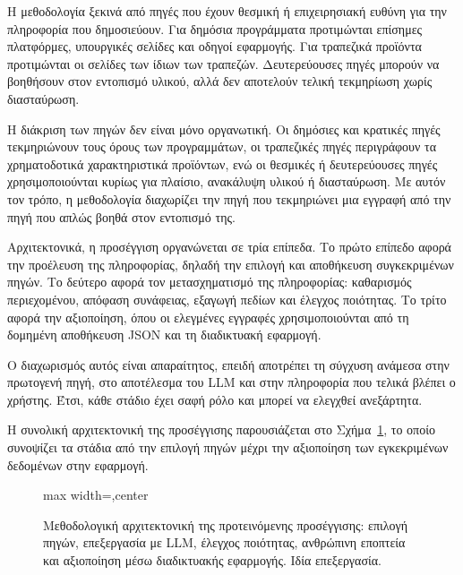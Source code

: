 Η μεθοδολογία ξεκινά από πηγές που έχουν θεσμική ή επιχειρησιακή ευθύνη για την
πληροφορία που δημοσιεύουν. Για δημόσια προγράμματα προτιμώνται επίσημες
πλατφόρμες, υπουργικές σελίδες και οδηγοί εφαρμογής. Για τραπεζικά προϊόντα
προτιμώνται οι σελίδες των ίδιων των τραπεζών. Δευτερεύουσες πηγές μπορούν να
βοηθήσουν στον εντοπισμό υλικού, αλλά δεν αποτελούν τελική τεκμηρίωση χωρίς
διασταύρωση.

Η διάκριση των πηγών δεν είναι μόνο οργανωτική. Οι δημόσιες και κρατικές πηγές
τεκμηριώνουν τους όρους των προγραμμάτων, οι τραπεζικές πηγές περιγράφουν τα
χρηματοδοτικά χαρακτηριστικά προϊόντων, ενώ οι θεσμικές ή δευτερεύουσες πηγές
χρησιμοποιούνται κυρίως για πλαίσιο, ανακάλυψη υλικού ή διασταύρωση. Με αυτόν
τον τρόπο, η μεθοδολογία διαχωρίζει την πηγή που τεκμηριώνει μια εγγραφή από
την πηγή που απλώς βοηθά στον εντοπισμό της.

Αρχιτεκτονικά, η προσέγγιση οργανώνεται σε τρία επίπεδα. Το πρώτο επίπεδο
αφορά την προέλευση της πληροφορίας, δηλαδή την επιλογή και αποθήκευση
συγκεκριμένων πηγών. Το δεύτερο αφορά τον μετασχηματισμό της πληροφορίας:
καθαρισμός περιεχομένου, απόφαση συνάφειας, εξαγωγή πεδίων και έλεγχος
ποιότητας. Το τρίτο αφορά την αξιοποίηση, όπου οι ελεγμένες εγγραφές
χρησιμοποιούνται από τη δομημένη αποθήκευση JSON και τη διαδικτυακή εφαρμογή.

Ο διαχωρισμός αυτός είναι απαραίτητος, επειδή αποτρέπει τη σύγχυση ανάμεσα
στην πρωτογενή πηγή, στο αποτέλεσμα του LLM και στην πληροφορία που τελικά
βλέπει ο χρήστης. Έτσι, κάθε στάδιο έχει σαφή ρόλο και μπορεί να ελεγχθεί
ανεξάρτητα.

Η συνολική αρχιτεκτονική της προσέγγισης παρουσιάζεται στο
Σχήμα~\ref{fig:methodology-architecture}, το οποίο συνοψίζει τα στάδια από την
επιλογή πηγών μέχρι την αξιοποίηση των εγκεκριμένων δεδομένων στην εφαρμογή.

\begin{figure}[!htbp]
    \centering
    \begin{adjustbox}{max width=\textwidth,center}
        
    \end{adjustbox}
    \caption[Μεθοδολογική αρχιτεκτονική της προτεινόμενης προσέγγισης]{Μεθοδολογική αρχιτεκτονική της προτεινόμενης προσέγγισης: επιλογή πηγών, επεξεργασία με LLM, έλεγχος ποιότητας, ανθρώπινη εποπτεία και αξιοποίηση μέσω διαδικτυακής εφαρμογής. Ιδία επεξεργασία.}
    \label{fig:methodology-architecture}
\end{figure}

